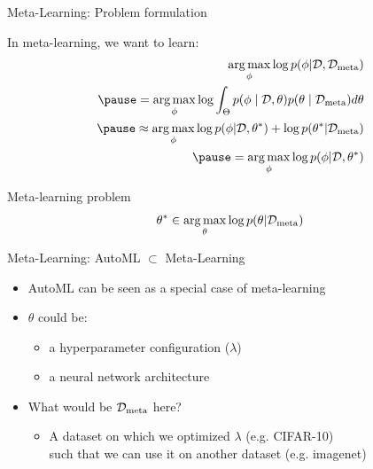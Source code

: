 \begin{frame}[c]{Meta-Learning: Problem formulation}

In meta-learning, we want to learn:
\begin{eqnarray*}
\argmax_{\phi} \log p(\phi|\dataset, \mdata) \\
\pause
= \argmax_{\phi} \log \int_{\Theta} p(\phi \mid \dataset, \theta) p(\theta \mid \mdata) d\theta\\
\pause
\approx \argmax_{\phi} \log p(\phi | \dataset, \theta^*) + \log p(\theta^* | \mdata)\\
\pause
= \argmax_{\phi} \log p(\phi | \dataset, \theta^*)
\end{eqnarray*}

\pause

\begin{center}
\begin{minipage}{0.5\textwidth}
\begin{block}{Meta-learning problem}
\begin{equation*}
\theta^* \in \operatorname*{arg\,max}_{\theta} \log p(\theta | \mathcal{D}_{\text{meta}})
\end{equation*}
\end{block}
\end{minipage}
\end{center}

\end{frame}
\begin{frame}[c]{Meta-Learning: AutoML $\subset$ Meta-Learning}

\begin{itemize}
	\item AutoML can be seen as a special case of meta-learning \pause
	\medskip
	\item $\theta$ could be:
	\begin{itemize}
		\item a hyperparameter configuration ($\lambda$) 
		\item a neural network architecture
	\end{itemize}
	\pause
	\medskip
	\item What would be $\mathcal{D}_{\text{meta}}$ here? 
	\pause
	\begin{itemize}
		\item A dataset on which we optimized $\lambda$ (e.g. CIFAR-10)\\ such that we can use it on another dataset (e.g. imagenet)
	\end{itemize}
\end{itemize}	

\end{frame}
